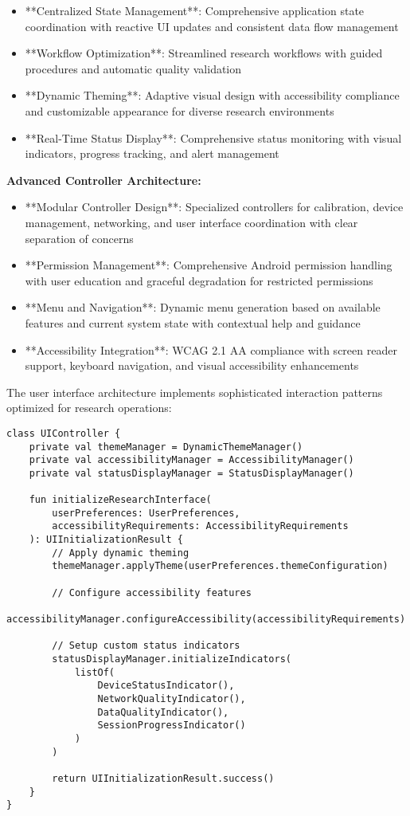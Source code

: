 \documentclass[12pt,a4paper]{article}
\begin{document}
\begin{itemize}
\item **Centralized State Management**: Comprehensive application state coordination with reactive UI updates and consistent
  data flow management
\item **Workflow Optimization**: Streamlined research workflows with guided procedures and automatic quality validation
\item **Dynamic Theming**: Adaptive visual design with accessibility compliance and customizable appearance for diverse
  research environments
\item **Real-Time Status Display**: Comprehensive status monitoring with visual indicators, progress tracking, and alert
  management

\end{itemize}
\textbf{Advanced Controller Architecture:}

\begin{itemize}
\item **Modular Controller Design**: Specialized controllers for calibration, device management, networking, and user
  interface coordination with clear separation of concerns
\item **Permission Management**: Comprehensive Android permission handling with user education and graceful degradation for
  restricted permissions
\item **Menu and Navigation**: Dynamic menu generation based on available features and current system state with contextual
  help and guidance
\item **Accessibility Integration**: WCAG 2.1 AA compliance with screen reader support, keyboard navigation, and visual
  accessibility enhancements

\end{itemize}
The user interface architecture implements sophisticated interaction patterns optimized for research operations:

\begin{verbatim}
class UIController {
    private val themeManager = DynamicThemeManager()
    private val accessibilityManager = AccessibilityManager()
    private val statusDisplayManager = StatusDisplayManager()

    fun initializeResearchInterface(
        userPreferences: UserPreferences,
        accessibilityRequirements: AccessibilityRequirements
    ): UIInitializationResult {
        // Apply dynamic theming
        themeManager.applyTheme(userPreferences.themeConfiguration)

        // Configure accessibility features
        accessibilityManager.configureAccessibility(accessibilityRequirements)

        // Setup custom status indicators
        statusDisplayManager.initializeIndicators(
            listOf(
                DeviceStatusIndicator(),
                NetworkQualityIndicator(),
                DataQualityIndicator(),
                SessionProgressIndicator()
            )
        )

        return UIInitializationResult.success()
    }
}
\end{verbatim}
\end{document}

